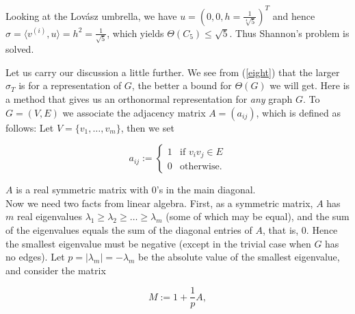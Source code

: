 \documentclass[openany,12pt]{memoir}
\newcommand{\setnewpagemargins}{
    \clearpage
    \setulmarginsandblock{2cm}{0.5cm}{*}
    \checkandfixthelayout
}
\begin{document}
Looking at the Lov\'asz umbrella, we have $u = (0, 0, h = {\frac{1}{\sqrt[4]{5}}})^T$ and hence
$\sigma = \langle v^{(i)}, u \rangle = h^2 = {\frac{1}{\sqrt{5}}}$, which yields $\Theta(C_5) \leq \sqrt{5}$. Thus Shannon's 
problem is solved.


\setnewpagemargins

\hspace{-140pt}

Let us carry our discussion a little further. We see from (\ref{eight}) that the larger $\sigma_T$
is for a representation of $G$, the better a bound for $\Theta(G)$ we will get. Here 
is a method that gives us an orthonormal representation for \textit{any} graph $G$. 
To $G = (V, E)$ we associate the adjacency matrix $A = (a_{ij})$, which is 
defined as follows: Let $V = \{v_1,\ldots,v_m\}$, then we set

\[
a_{ij} := \left\{ \begin{array}{rcl}
  1 & \mbox{if $v_i v_j \in E$}\\
  0 & \mbox{otherwise.}
  \end{array}\right.
\]

$A$ is a real symmetric matrix with $0$'s in the main diagonal.\\ 
Now we need two facts from linear algebra. First, as a symmetric matrix, 
$A$ has $m$ real eigenvalues $\lambda_1 \geq \lambda_2 \geq \ldots \geq \lambda_m$ \spaceskip(some of which may be equal),
and the sum of the eigenvalues equals the sum of the diagonal 
entries of $A$, that is, 0. Hence the smallest eigenvalue must be negative 
(except in the trivial case when $G$ has no edges). {Let $p = |\lambda_m| = -\lambda_m$} be 
the absolute value of the smallest eigenvalue, and consider the matrix

\[
M := 1 + {\frac{1}{p}}A,
\]
\end{document}
